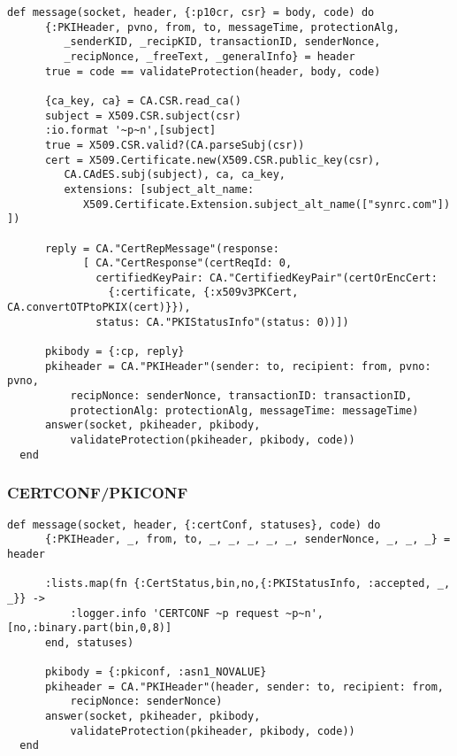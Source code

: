 \begin{lstlisting}
def message(socket, header, {:p10cr, csr} = body, code) do
      {:PKIHeader, pvno, from, to, messageTime, protectionAlg,
         _senderKID, _recipKID, transactionID, senderNonce,
         _recipNonce, _freeText, _generalInfo} = header
      true = code == validateProtection(header, body, code)

      {ca_key, ca} = CA.CSR.read_ca()
      subject = X509.CSR.subject(csr)
      :io.format '~p~n',[subject]
      true = X509.CSR.valid?(CA.parseSubj(csr))
      cert = X509.Certificate.new(X509.CSR.public_key(csr),
         CA.CAdES.subj(subject), ca, ca_key,
         extensions: [subject_alt_name:
            X509.Certificate.Extension.subject_alt_name(["synrc.com"]) ])

      reply = CA."CertRepMessage"(response:
            [ CA."CertResponse"(certReqId: 0,
              certifiedKeyPair: CA."CertifiedKeyPair"(certOrEncCert:
                {:certificate, {:x509v3PKCert, CA.convertOTPtoPKIX(cert)}}),
              status: CA."PKIStatusInfo"(status: 0))])

      pkibody = {:cp, reply}
      pkiheader = CA."PKIHeader"(sender: to, recipient: from, pvno: pvno,
          recipNonce: senderNonce, transactionID: transactionID,
          protectionAlg: protectionAlg, messageTime: messageTime)
      answer(socket, pkiheader, pkibody,
          validateProtection(pkiheader, pkibody, code))
  end
\end{lstlisting}

\newpage
\subsubsection{CERTCONF/PKICONF}

\begin{lstlisting}
def message(socket, header, {:certConf, statuses}, code) do
      {:PKIHeader, _, from, to, _, _, _, _, _, senderNonce, _, _, _} = header

      :lists.map(fn {:CertStatus,bin,no,{:PKIStatusInfo, :accepted, _, _}} ->
          :logger.info 'CERTCONF ~p request ~p~n', [no,:binary.part(bin,0,8)]
      end, statuses)

      pkibody = {:pkiconf, :asn1_NOVALUE}
      pkiheader = CA."PKIHeader"(header, sender: to, recipient: from,
          recipNonce: senderNonce)
      answer(socket, pkiheader, pkibody,
          validateProtection(pkiheader, pkibody, code))
  end
\end{lstlisting}


